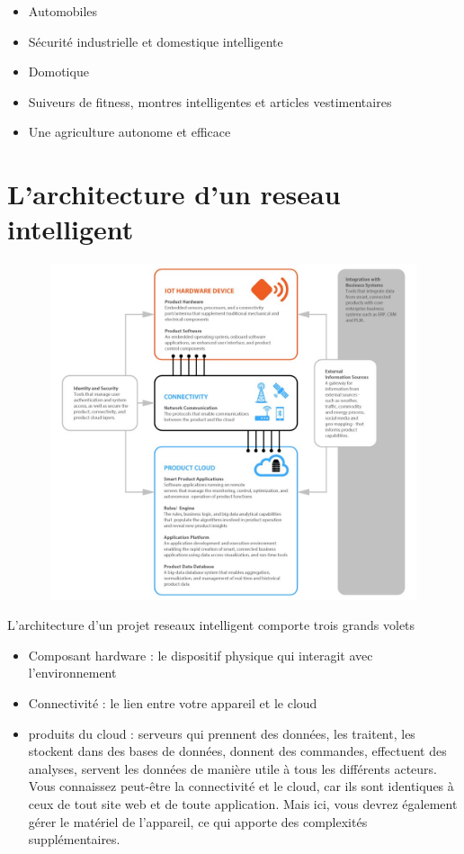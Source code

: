 \documentclass[12pt]{report}
\begin{document}
\begin{itemize}
      \item
            Automobiles
      \item
            Sécurité industrielle et domestique intelligente
      \item
            Domotique
      \item
            Suiveurs de fitness, montres intelligentes et articles vestimentaires
      \item
            Une agriculture autonome et efficace
\end{itemize}

\hypertarget{larchitecture-dun-projet-reseaux intelligent}{%
      \chapter{\texorpdfstring{L'architecture d'un reseau intelligent
        }{L'architecture d'un reseau intelligent }}\label{larchitecture-dun-projet-reseaux intelligent}}

\includegraphics[width=5.83333in,height=3.88889in]{figs/iot_arch.jpeg}

L'architecture d'un projet reseaux intelligent comporte trois grands volets

\begin{itemize}
      \item
            Composant hardware : le dispositif physique qui interagit avec
            l'environnement
      \item
            Connectivité : le lien entre votre appareil et le cloud
      \item
            produits du cloud  : serveurs qui prennent des données, les traitent,
            les stockent dans des bases de données, donnent des commandes,
            effectuent des analyses, servent les données de manière utile à tous
            les différents acteurs. Vous connaissez peut-être la connectivité et
            le cloud, car ils sont identiques à ceux de tout site web et de toute
            application. Mais ici, vous devrez également gérer le matériel de
            l'appareil, ce qui apporte des complexités supplémentaires.
\end{itemize}
\end{document}
